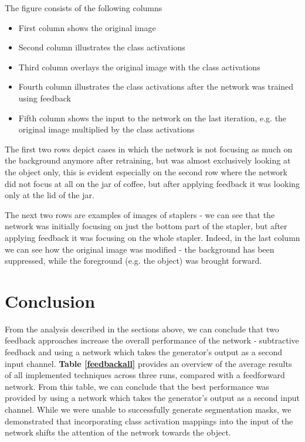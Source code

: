 \documentclass{l4proj}
\begin{document}
The figure consists of the following columns
\begin{itemize}
    \item First column shows the original image
    \item Second column illustrates the class activations
    \item Third column overlays the original image with the class activations
    \item Fourth column illustrates the class activations after the network was trained using feedback
    \item Fifth column shows the input to the network on the last iteration, e.g. the original image multiplied by the class activations
\end{itemize}

The first two rows depict cases in which the network is not focusing as much on the background anymore after retraining, but was almost exclusively looking at the object only, this is evident especially on the second row where the network did not focus at all on the jar of coffee, but after applying feedback it was looking only at the lid of the jar.

The next two rows are examples of images of staplers - we can see that the network was initially focusing on just the bottom part of the stapler, but after applying feedback it was focusing on the whole stapler. Indeed, in the last column we can see how the original image was modified - the background has been suppressed, while the foreground (e.g. the object) was brought forward.

\section{Conclusion}
From the analysis described in the sections above, we can conclude that two feedback approaches increase the overall performance of the network - subtractive feedback and using a network which takes the generator's output as a second input channel. \textbf{Table \ref{feedbackall}} provides an overview of the average results of all implemented techniques across three runs, compared with a feedforward network. From this table, we can conclude that the best performance was provided by using a network which takes the generator's output as a second input channel. While we were unable to successfully generate segmentation masks, we demonstrated that incorporating class activation mappings into the input of the network shifts the attention of the network towards the object.
\end{document}
